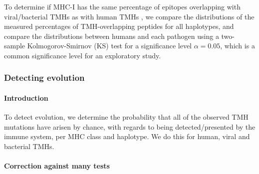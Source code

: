 To determine if MHC-I has the same percentage of epitopes overlapping
with viral/bacterial TMHs as with human TMHs , 
we compare the distributions of the measured percentages 
of TMH-overlapping peptides for all haplotypes,
and compare the distributions between humans and each pathogen
using a two-sample Kolmogorov-Smirnov (KS) test
for a significance level $\alpha = 0.05$, 
which is a common significance level for an exploratory study.

\subsubsection{Detecting evolution}

\paragraph{Introduction}

To detect evolution, we determine the probability 
that all of the observed TMH mutations have arisen by chance,
with regards to being detected/presented by the immune system,
per MHC class and haplotype. We do this for human, viral and
bacterial TMHs.

\paragraph{Correction against many tests}

%


